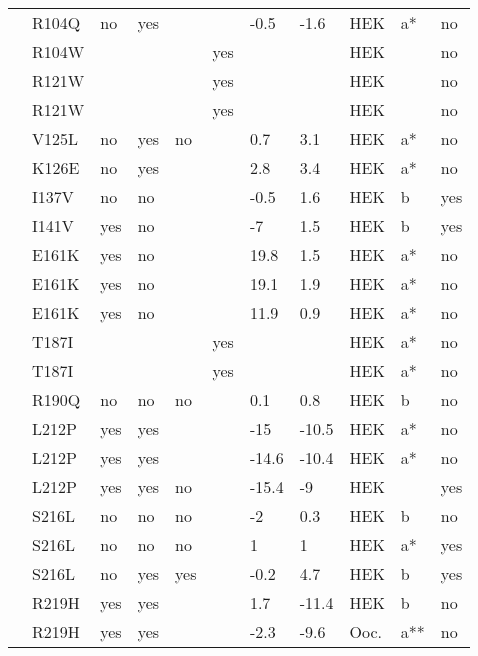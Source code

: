 \begin{tiny}
\begin{longtable}{p{4cm}|l|llll|ll|lll}
\citet{Guetter2013MutationDB} & R104Q & no & yes &  &  & -0.5 & -1.6 & HEK & a* & no \\
\citet{Clatot2012MutationDB} & R104W &  &  &  & yes &  &  & HEK &  & no \\
\citet{Clatot2012MutationDB} & R121W &  &  &  & yes &  &  & HEK &  & no \\
\citet{Holst2010MutationDB} & R121W &  &  &  & yes &  &  & HEK &  & no \\
\citet{Guetter2013MutationDB} & V125L & no & yes & no &  & 0.7 & 3.1 & HEK & a* & no \\
\citet{Guetter2013MutationDB} & K126E & no & yes &  &  & 2.8 & 3.4 & HEK & a* & no \\
\citet{Swan2014MutationDB} & I137V & no & no &  &  & -0.5 & 1.6 & HEK & b & yes \\
\citet{Swan2014MutationDB} & I141V & yes & no &  &  & -7 & 1.5 & HEK & b & yes \\
\citet{Gui2010aMutationDB} & E161K & yes & no &  &  & 19.8 & 1.5 & HEK & a* & no \\
\citet{Gui2010bMutationDB} & E161K & yes & no &  &  & 19.1 & 1.9 & HEK & a* & no \\
\citet{Smits2005aMutationDB} & E161K & yes & no &  &  & 11.9 & 0.9 & HEK & a* & no \\
\citet{Gui2010aMutationDB} & T187I &  &  &  & yes &  &  & HEK & a* & no \\
\citet{Gui2010bMutationDB} & T187I &  &  &  & yes &  &  & HEK & a* & no \\
\citet{Kapplinger2015MutationDB} & R190Q & no & no & no &  & 0.1 & 0.8 & HEK & b & no \\
\citet{Gui2010aMutationDB} & L212P & yes & yes &  &  & -15 & -10.5 & HEK & a* & no \\
\citet{Gui2010bMutationDB} & L212P & yes & yes &  &  & -14.6 & -10.4 & HEK & a* & no \\
\citet{Makita2005MutationDB} & L212P & yes & yes & no &  & -15.4 & -9 & HEK &  & yes \\
\citet{Kapplinger2015MutationDB} & S216L & no & no & no &  & -2 & 0.3 & HEK & b & no \\
\citet{Marangoni2011MutationDB} & S216L & no & no & no &  & 1 & 1 & HEK & a* & yes \\
\citet{Wang2007aMutationDB} & S216L & no & yes & yes &  & -0.2 & 4.7 & HEK & b & yes \\
\citet{Abe2014MutationDB} & R219H & yes & yes &  &  & 1.7 & -11.4 & HEK & b & no \\
\citet{Chen1996MutationDB} & R219H & yes & yes &  &  & -2.3 & -9.6 & Ooc. & a** & no \\

\end{longtable}
\end{tiny}
